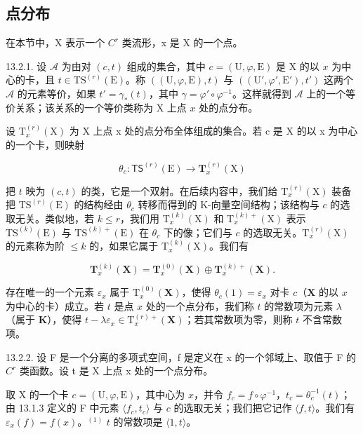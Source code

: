 \subsection{点分布}

在本节中，X 表示一个 \(C^{r}\) 类流形，x 是 X 的一个点。

13.2.1. 设 \(\mathcal{A}\) 为由对 \((c, t)\) 组成的集合，其中 \(c = (\mathrm{U}, \varphi, \mathrm{E})\) 是 X 的以 \(x\) 为中心的卡，且 \(t \in \mathrm{TS}^{(r)}(\mathrm{E})\)。称 \(((\mathrm{U}, \varphi, \mathrm{E}), t)\) 与 \(((\mathrm{U}', \varphi', \mathrm{E}'), t')\) 这两个 \(\mathcal{A}\) 的元素等价，如果 \(t' = \gamma_*(t)\)，其中 \(\gamma = \varphi' \circ \varphi^{-1}\)。这样就得到 \(\mathcal{A}\) 上的一个等价关系；该关系的一个等价类称为 X 上点 \(x\) 处的点分布。

设 \(\mathrm{T}_{x}^{(r)}(\mathrm{X})\) 为 X 上点 x 处的点分布全体组成的集合。若 c 是 X 的以 x 为中心的一个卡，则映射

\[
\theta_ {c} \colon \mathsf {T S} ^ {(r)} (\mathrm{E}) \to \mathbf {T} _ {x} ^ {(r)} (\mathrm{X})
\]

把 \(t\) 映为 \((c, t)\) 的类，它是一个双射。在后续内容中，我们给 \(\mathrm{T}_{x}^{(r)}(\mathrm{X})\) 装备把 \(\mathrm{TS}^{(r)}(\mathrm{E})\) 的结构经由 \(\theta_{c}\) 转移而得到的 K-向量空间结构；该结构与 \(c\) 的选取无关。类似地，若 \(k \leqslant r\)，我们用 \(\mathrm{T}_{x}^{(k)}(\mathrm{X})\) 和 \(\mathrm{T}_{x}^{(k)+}(\mathrm{X})\) 表示 \(\mathrm{TS}^{(k)}(\mathrm{E})\) 与 \(\mathrm{TS}^{(k)+}(\mathrm{E})\) 在 \(\theta_{c}\) 下的像；它们与 \(c\) 的选取无关。\(\mathrm{T}_{x}^{(r)}(\mathrm{X})\) 的元素称为阶 \(\leqslant k\) 的，如果它属于 \(\mathrm{T}_{x}^{(k)}(\mathrm{X})\)。我们有

\[
\mathbf {T} _ {x} ^ {(k)} (\mathbf {X}) = \mathbf {T} _ {x} ^ {(0)} (\mathbf {X}) \oplus \mathbf {T} _ {x} ^ {(k) +} (\mathbf {X}).
\]

存在唯一的一个元素 \(\varepsilon_x\) 属于 \(\mathrm{T}_x^{(0)}(\mathbf{X})\)，使得 \(\theta_c(1) = \varepsilon_x\) 对卡 \(c\)（\(\mathbf{X}\) 的以 \(x\) 为中心的卡）成立。若 \(t\) 是点 \(x\) 处的一个点分布，我们称 \(t\) 的常数项为元素 \(\lambda\)（属于 \(\mathbf{K}\)），使得 \(t - \lambda \varepsilon_x \in \mathrm{T}_x^{(r)+}(\mathbf{X})\)；若其常数项为零，则称 \(t\) 不含常数项。

13.2.2. 设 F 是一个分离的多项式空间，f 是定义在 x 的一个邻域上、取值于 F 的 \(C^{r}\) 类函数。设 t 是 X 上点 x 处的一个点分布。

取 X 的一个卡 \(c = (\mathrm{U}, \varphi, \mathrm{E})\)，其中心为 \(x\)，并令 \(f_c = f \circ \varphi^{-1}\)，\(t_c = \theta_c^{-1}(t)\)；由 13.1.3 定义的 F 中元素 \(\langle f_c, t_c \rangle\) 与 \(c\) 的选取无关；我们把它记作 \(\langle f, t \rangle\)。我们有 \(\varepsilon_x(f) = f(x)\)。\(^{(1)}\) \(t\) 的常数项是 \(\langle 1, t \rangle\)。


